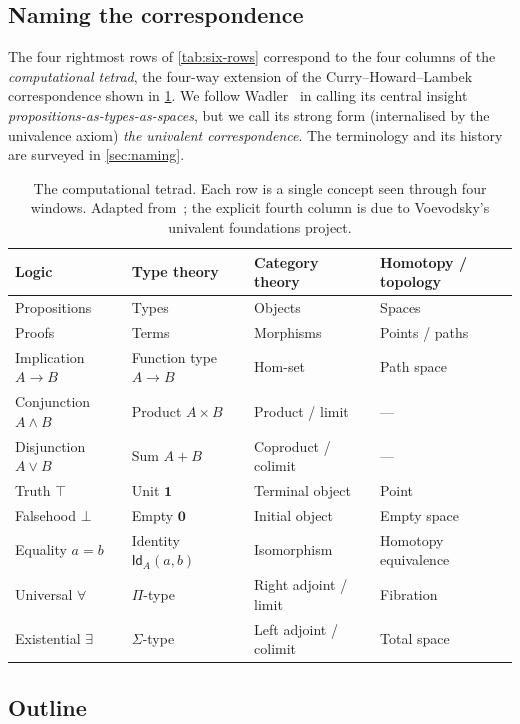 \documentclass[12pt]{article}
\theoremstyle{definition}
\theoremstyle{remark}
\newcommand{\Id}{\mathsf{Id}}
\begin{document}
\subsection{Naming the correspondence}

The four rightmost rows of \cref{tab:six-rows} correspond to the four
columns of the \emph{computational tetrad}, the four-way extension of the
Curry--Howard--Lambek correspondence shown in \cref{tab:tetrad}. We follow
Wadler~\cite{Wadler2015} in calling its central insight
\emph{propositions-as-types-as-spaces}, but we call its strong form
(internalised by the univalence axiom) \emph{the univalent correspondence}.
The terminology and its history are surveyed in \cref{sec:naming}.

\begin{table}[ht]
\centering
\begin{tabularx}{\textwidth}{X X X X}
\toprule
\textbf{Logic} & \textbf{Type theory} & \textbf{Category theory} &
\textbf{Homotopy / topology} \\
\midrule
Propositions & Types & Objects & Spaces \\
Proofs & Terms & Morphisms & Points / paths \\
Implication $A \to B$ & Function type $A \to B$ & Hom-set & Path space \\
Conjunction $A \wedge B$ & Product $A \times B$ & Product / limit & --- \\
Disjunction $A \vee B$ & Sum $A + B$ & Coproduct / colimit & --- \\
Truth $\top$ & Unit $\mathbf{1}$ & Terminal object & Point \\
Falsehood $\bot$ & Empty $\mathbf{0}$ & Initial object & Empty space \\
Equality $a = b$ & Identity $\Id_A(a, b)$ & Isomorphism & Homotopy equivalence \\
Universal $\forall$ & $\Pi$-type & Right adjoint / limit & Fibration \\
Existential $\exists$ & $\Sigma$-type & Left adjoint / colimit & Total space \\
\bottomrule
\end{tabularx}
\caption{The computational tetrad. Each row is a single concept seen
through four windows. Adapted from~\cite{Wadler2015,HoTTBook}; the
explicit fourth column is due to Voevodsky's univalent foundations
project.}
\label{tab:tetrad}
\end{table}

\subsection{Outline}
\end{document}
